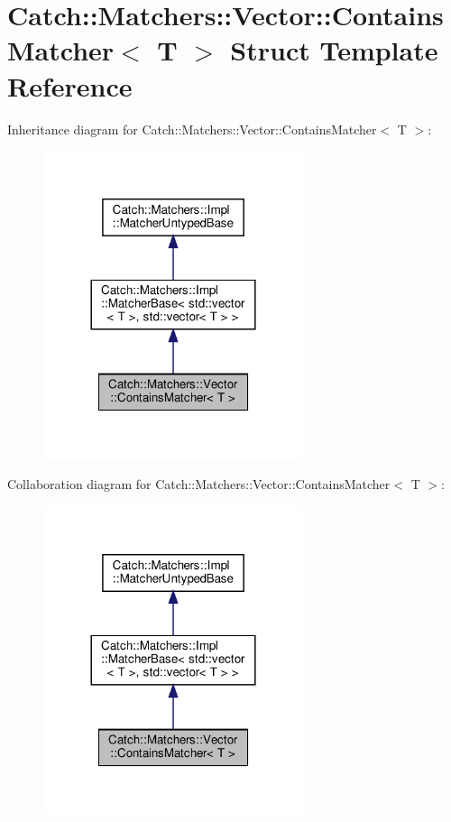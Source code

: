 \hypertarget{structCatch_1_1Matchers_1_1Vector_1_1ContainsMatcher}{}\section{Catch\+:\+:Matchers\+:\+:Vector\+:\+:Contains\+Matcher$<$ T $>$ Struct Template Reference}
\label{structCatch_1_1Matchers_1_1Vector_1_1ContainsMatcher}


Inheritance diagram for Catch\+:\+:Matchers\+:\+:Vector\+:\+:Contains\+Matcher$<$ T $>$\+:
\nopagebreak
\begin{figure}[H]
\begin{center}
\leavevmode
\includegraphics[width=216pt]{structCatch_1_1Matchers_1_1Vector_1_1ContainsMatcher__inherit__graph}
\end{center}
\end{figure}


Collaboration diagram for Catch\+:\+:Matchers\+:\+:Vector\+:\+:Contains\+Matcher$<$ T $>$\+:
\nopagebreak
\begin{figure}[H]
\begin{center}
\leavevmode
\includegraphics[width=216pt]{structCatch_1_1Matchers_1_1Vector_1_1ContainsMatcher__coll__graph}
\end{center}
\end{figure}
